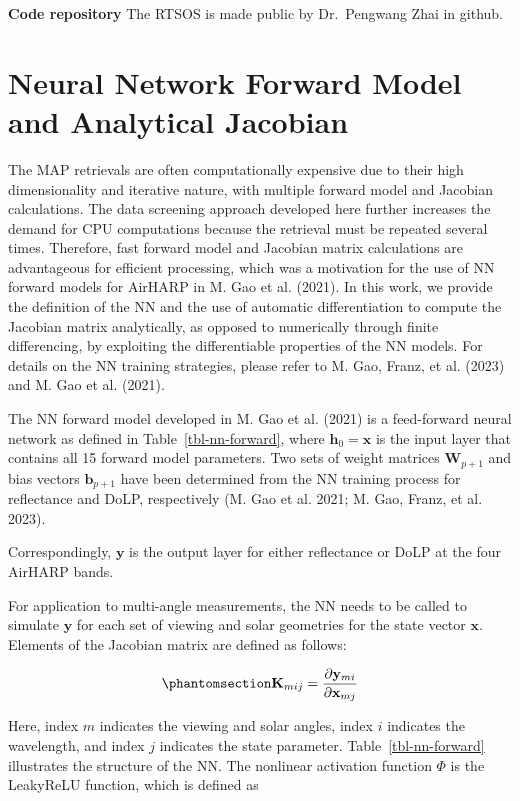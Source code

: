 \documentclass[
  11pt,
  letterpaper,
  DIV=11,
  numbers=noendperiod]{scrreprt}
\begin{document}
\textbf{Code repository} The RTSOS is made public by Dr.~Pengwang Zhai
in github.

\chapter{Neural Network Forward Model and Analytical
Jacobian}\label{neural-network-forward-model-and-analytical-jacobian}

The MAP retrievals are often computationally expensive due to their high
dimensionality and iterative nature, with multiple forward model and
Jacobian calculations. The data screening approach developed here
further increases the demand for CPU computations because the retrieval
must be repeated several times. Therefore, fast forward model and
Jacobian matrix calculations are advantageous for efficient processing,
which was a motivation for the use of NN forward models for AirHARP in
M. Gao et al. (2021). In this work, we provide the definition of the NN
and the use of automatic differentiation to compute the Jacobian matrix
analytically, as opposed to numerically through finite differencing, by
exploiting the differentiable properties of the NN models. For details
on the NN training strategies, please refer to M. Gao, Franz, et al.
(2023) and M. Gao et al. (2021).

The NN forward model developed in M. Gao et al. (2021) is a feed-forward
neural network as defined in Table~\ref{tbl-nn-forward}, where
\(\mathbf{h}_0=\mathbf{x}\) is the input layer that contains all 15
forward model parameters. Two sets of weight matrices
\(\mathbf{W}_{p+1}\) and bias vectors \(\mathbf{b}_{p+1}\) have been
determined from the NN training process for reflectance and DoLP,
respectively (M. Gao et al. 2021; M. Gao, Franz, et al. 2023).

Correspondingly, \(\mathbf{y}\) is the output layer for either
reflectance or DoLP at the four AirHARP bands.

For application to multi-angle measurements, the NN needs to be called
to simulate \(\mathbf{y}\) for each set of viewing and solar geometries
for the state vector \(\mathbf{x}\). Elements of the Jacobian matrix are
defined as follows:

\begin{equation}\phantomsection\label{eq-jacobian}{
\mathbf{K}_{mij}
=
\frac{\partial \mathbf{y}_{mi}}
{\partial \mathbf{x}_{mj}}
}\end{equation}

Here, index \(m\) indicates the viewing and solar angles, index \(i\)
indicates the wavelength, and index \(j\) indicates the state parameter.
Table~\ref{tbl-nn-forward} illustrates the structure of the NN. The
nonlinear activation function \(\Phi\) is the LeakyReLU function, which
is defined as
\end{document}
